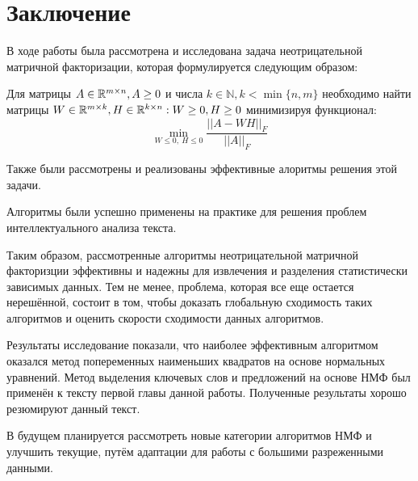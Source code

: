 
\chapter*{Заключение}

В ходе работы была рассмотрена и исследована задача неотрицательной матричной факторизации, которая формулируется следующим образом:

Для матрицы $A \in \mathbb{R}^{m \times n}, A \geq 0$ и числа $k \in \mathbb{N}, k < \min\{n, m\}$
необходимо найти матрицы $W \in \mathbb{R}^{m \times k}, H \in \mathbb{R}^{k \times n} : W \geq 0, H \geq 0$ минимизируя функционал:
\begin{equation*}
  \min_{W \leq 0, \ H \leq 0} \dfrac{||A - WH||_F}{|| A ||_F}
\end{equation*}

Также были рассмотрены и реализованы эффективные алоритмы решения этой задачи.

Алгоритмы были успешно применены на практике для решения проблем интеллектуального анализа текста.

Таким образом, рассмотренные алгоритмы неотрицательной матричной факторизции
эффективны и надежны для извлечения и разделения статистически зависимых данных.
Тем не менее, проблема, которая все еще остается нерешённой, состоит в том,
чтобы доказать глобальную сходимость таких алгоритмов и оценить скорости сходимости данных алгоритмов.

Результаты исследование показали, что наиболее эффективным алгоритмом оказался метод попеременных наименьших квадратов на основе нормальных уравнений.
Метод выделения ключевых слов и предложений на основе НМФ был применён к тексту первой главы данной работы.
Полученные результаты хорошо резюмируют данный текст.

В будущем планируется рассмотреть новые категории алгоритмов НМФ и улучшить текущие, путём адаптации для работы с большими разреженными данными.
